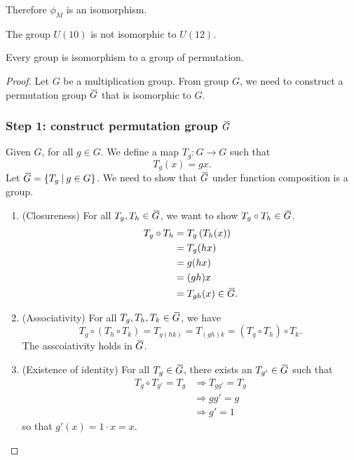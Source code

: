\begin{solution}
    Therefore $\phi_M$ is an isomorphism.
\end{solution}

\begin{example}
    The group $U(10)$ is not isomorphic to $U(12)$.
\end{example}

\begin{theorem}
    Every group is isomorphism to a group of permutation.
\end{theorem}
\begin{proof}
    Let $G$ be a multiplication group. From group $G$, we need to construct a permutation group $\,\overline{\!{G}}$ that is 
    isomorphic to $G$.

    \subsubsection*{Step 1: construct permutation group $\,\overline{\!{G}}$}

    Given $G$, for all $g \in G$. We define a map $T_g : G \to G$ such that 
    \[
        T_g(x) = gx.
    \]
    Let $\,\overline{\!{G}} = \{T_g \> | \> g \in G \}$. We need to show that $\,\overline{\!{G}}$ under function composition is a 
    group.

    \begin{enumerate}
        \item (Closureness) For all $T_g, T_h \in \,\overline{\!{G}}$, we want to show $T_g \circ T_h \in \,\overline{\!{G}}$.
            \begin{align*}
                T_g \circ T_h &= T_g \left( T_h (x)\right)\\
                &= T_g(hx)\\
                &= g(hx)\\
                &= (gh)x\\
                &= T_{gh}(x) \in \,\overline{\!{G}}.
            \end{align*}
        
        \item (Associativity) For all $T_g, T_h, T_k \in \,\overline{\!{G}}$, we have 
        \[
            T_g \circ (T_h \circ T_k) = T_{g(hk)} = T_{(gh)k} = (T_g \circ T_h) \circ T_k.
        \]
        The asscoiativity holds in $\,\overline{\!{G}}$.

        \item (Existence of identity) For all $T_g \in \,\overline{\!{G}}$, there exists an $T_{g'} \in \,\overline{\!{G}}$ such that 
        \begin{align*}
            T_g \circ T_{g'} = T_g &\Rightarrow T_{gg'} = T_g\\
            &\Rightarrow gg' = g\\
            &\Rightarrow g' = 1
        \end{align*}
        so that $g'(x) = 1 \cdot x = x$.


\end{enumerate}
\end{proof}
